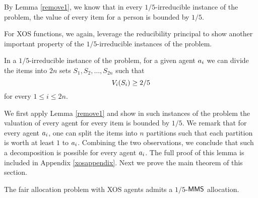 By Lemma \ref{remove1}, we know that in every $1/5$-irreducible instance of the problem, the value of every item for a person is bounded by $1/5$. 
\begin{comment}
\begin{lemma}\label{xosreducible}
In every $1/5$-irreducible instance of the problem we have $\valu_i(\{\ite_j\}) \leq 1/5$ for every $\agent_i \in \agents$ and $\ite_j \in \items$.
\end{lemma}
\end{comment}
For XOS functions, we again, leverage the reducibility principal to show another important property of the $1/5$-irreducible instances of the problem. 
\begin{lemma}
\label{2nsets}
In a $1/5$-irreducible instance of the problem, for a given agent $a_i$ we can divide the items into $2n$ sets $S_1, S_2, \ldots, S_{2n}$ such that
$$V_i(S_i) \geq 2/5$$
for every $1 \leq i \leq 2n$.
\end{lemma}
We first apply Lemma \ref{remove1} and show in such instances of the problem the valuation of every agent for every item is bounded by $1/5$. We remark that for every agent $a_i$, one can split the items into $n$ partitions such that each partition is worth at least $1$ to $a_i$. Combining the two observations, we conclude that such a decomposition is possible for every agent $a_i$. The full proof of this lemma is included in Appendix \ref{xosappendix}. Next we prove the main theorem of this section.
\begin{theorem}\label{xosproof}
The fair allocation problem with XOS agents admits a $1/5$-$\mathsf{MMS}$ allocation.
\end{theorem}
